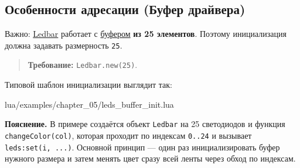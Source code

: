 \subsection{Особенности адресации (Буфер драйвера)}
Важно: \hyperlink{term:ledbar}{Ledbar} работает с \hyperlink{term:buffer}{буфером} \textbf{из 25 элементов}. Поэтому инициализация должна задавать размерность \verb|25|.
\begin{quote}
\textbf{Требование:} \verb|Ledbar.new(25)|.
\end{quote}

Типовой шаблон инициализации выглядит так:

\begin{codefile}{lua/examples/chapter_05/leds_buffer_init.lua}
\end{codefile}

\textbf{Пояснение.} В примере создаётся объект \verb|Ledbar| на 25 светодиодов и функция \verb|changeColor(col)|, которая проходит по индексам \verb|0..24| и вызывает \verb|leds:set(i, ...)|. Основной принцип — один раз инициализировать буфер нужного размера и затем менять цвет сразу всей ленты через обход по индексам.
